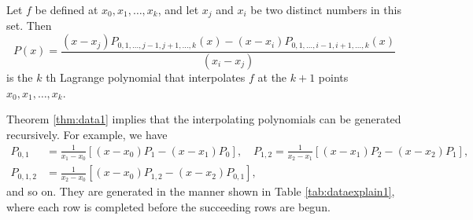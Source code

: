 \begin{theorem}\label{thm:data1}
Let $f$ be defined at $x_{0}, x_{1}, \ldots, x_{k}$, and let $x_{j}$ and $x_{i}$ be two distinct numbers in this set. Then
\[P(x)=\frac{\left(x-x_{j}\right) P_{0,1, \ldots, j-1, j+1, \ldots, k}(x)-\left(x-x_{i}\right) P_{0,1, \ldots, i-1, i+1, \ldots, k}(x)}{\left(x_{i}-x_{j}\right)}\]
is the $k$ th Lagrange polynomial that interpolates $f$ at the $k+1$ points $x_{0}, x_{1}, \ldots, x_{k}$.
\end{theorem}
%
%
%
%
%

Theorem \ref{thm:data1} implies that the interpolating polynomials can be generated recursively. For example, we have
\[\begin{aligned}
P_{0,1} & =\frac{1}{x_{1}-x_{0}}\left[\left(x-x_{0}\right) P_{1}-\left(x-x_{1}\right) P_{0}\right], \quad P_{1,2}=\frac{1}{x_{2}-x_{1}}\left[\left(x-x_{1}\right) P_{2}-\left(x-x_{2}\right) P_{1}\right], \\
P_{0,1,2} & =\frac{1}{x_{2}-x_{0}}\left[\left(x-x_{0}\right) P_{1,2}-\left(x-x_{2}\right) P_{0,1}\right],
\end{aligned}\]
and so on. They are generated in the manner shown in Table \ref{tab:dataexplain1}, where each row is completed before the succeeding rows are begun.

